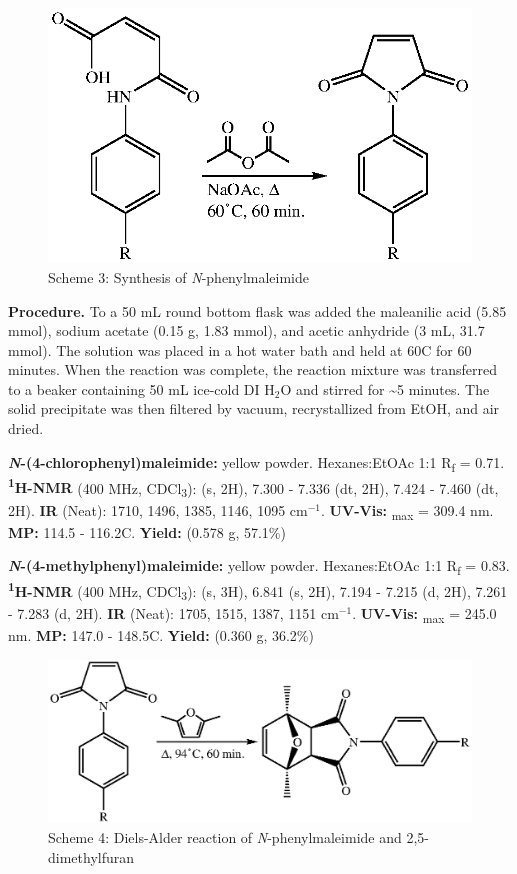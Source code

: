 \documentclass[11pt]{article}
\let\bf\textbf
\begin{document}
\begin{figure}[H]
    \centering
    \includegraphics[scale=0.8]{schemes/scheme2.eps}
    \caption*{Scheme 3: Synthesis of \textit{N}-phenylmaleimide}
\end{figure}

\bf{Procedure.} To a 50 mL round bottom flask was added the maleanilic acid (5.85 mmol), sodium acetate (0.15 g, 1.83 mmol), and acetic anhydride (3 mL, 31.7 mmol). The solution was placed in a hot water bath and held at 60\degree C for 60 minutes. When the reaction was complete, the reaction mixture was transferred to a beaker containing 50 mL ice-cold DI H$_2$O and stirred for \textasciitilde 5 minutes. The solid precipitate was then filtered by vacuum, recrystallized from EtOH, and air dried.

\bf{\textit{N}-(4-chlorophenyl)maleimide:} yellow powder. Hexanes:EtOAc 1:1 R\textsubscript{f} = 0.71. \bf{\textsuperscript{1}H-NMR} (400 MHz, CDCl\textsubscript{3}): \textdelta{} (s, 2H), 7.300 - 7.336 (dt, 2H), 7.424 - 7.460 (dt, 2H). \bf{IR} (Neat): 1710, 1496, 1385, 1146, 1095 cm$^{-1}$. \bf{UV-Vis:} \textlambda\textsubscript{max} = 309.4 nm. \bf{MP:} 114.5 - 116.2\degree C. \bf{Yield:} (0.578 g, 57.1\%)

\bf{\textit{N}-(4-methylphenyl)maleimide:} yellow powder. Hexanes:EtOAc 1:1 R\textsubscript{f} = 0.83. \bf{\textsuperscript{1}H-NMR} (400 MHz, CDCl\textsubscript{3}): \textdelta{} (s, 3H), 6.841 (s, 2H), 7.194 - 7.215 (d, 2H), 7.261 - 7.283 (d, 2H). \bf{IR} (Neat): 1705, 1515, 1387, 1151 cm$^{-1}$. \bf{UV-Vis:} \textlambda\textsubscript{max} = 245.0 nm. \bf{MP:} 147.0 - 148.5\degree C. \bf{Yield:} (0.360 g, 36.2\%)

\begin{figure}[H]
    \centering
    \includegraphics[scale=0.8]{schemes/scheme3.eps}
    \caption*{Scheme 4: Diels-Alder reaction of \textit{N}-phenylmaleimide and 2,5-dimethylfuran}
\end{figure}
\end{document}
